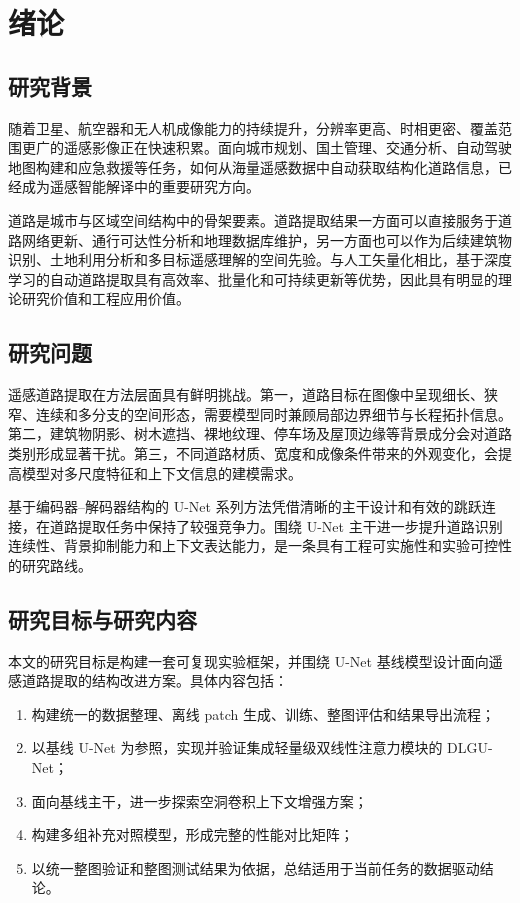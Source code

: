 \documentclass[12pt,a4paper]{ctexart}
\begin{document}
\newpage
\tableofcontents
\newpage
{}

\section{绪论}
\subsection{研究背景}
随着卫星、航空器和无人机成像能力的持续提升，分辨率更高、时相更密、覆盖范围更广的遥感影像正在快速积累。面向城市规划、国土管理、交通分析、自动驾驶地图构建和应急救援等任务，如何从海量遥感数据中自动获取结构化道路信息，已经成为遥感智能解译中的重要研究方向\cite{mnih2013,deepglobe2018}。

道路是城市与区域空间结构中的骨架要素。道路提取结果一方面可以直接服务于道路网络更新、通行可达性分析和地理数据库维护，另一方面也可以作为后续建筑物识别、土地利用分析和多目标遥感理解的空间先验。与人工矢量化相比，基于深度学习的自动道路提取具有高效率、批量化和可持续更新等优势，因此具有明显的理论研究价值和工程应用价值。

\subsection{研究问题}
遥感道路提取在方法层面具有鲜明挑战。第一，道路目标在图像中呈现细长、狭窄、连续和多分支的空间形态，需要模型同时兼顾局部边界细节与长程拓扑信息。第二，建筑物阴影、树木遮挡、裸地纹理、停车场及屋顶边缘等背景成分会对道路类别形成显著干扰。第三，不同道路材质、宽度和成像条件带来的外观变化，会提高模型对多尺度特征和上下文信息的建模需求。

基于编码器--解码器结构的 U-Net 系列方法凭借清晰的主干设计和有效的跳跃连接，在道路提取任务中保持了较强竞争力\cite{unet2015}。围绕 U-Net 主干进一步提升道路识别连续性、背景抑制能力和上下文表达能力，是一条具有工程可实施性和实验可控性的研究路线。

\subsection{研究目标与研究内容}
本文的研究目标是构建一套可复现实验框架，并围绕 U-Net 基线模型设计面向遥感道路提取的结构改进方案。具体内容包括：
\begin{enumerate}[label=\arabic*)]
    \item 构建统一的数据整理、离线 patch 生成、训练、整图评估和结果导出流程；
    \item 以基线 U-Net 为参照，实现并验证集成轻量级双线性注意力模块的 DLGU-Net；
    \item 面向基线主干，进一步探索空洞卷积上下文增强方案；
    \item 构建多组补充对照模型，形成完整的性能对比矩阵；
    \item 以统一整图验证和整图测试结果为依据，总结适用于当前任务的数据驱动结论。
\end{enumerate}
\end{document}
